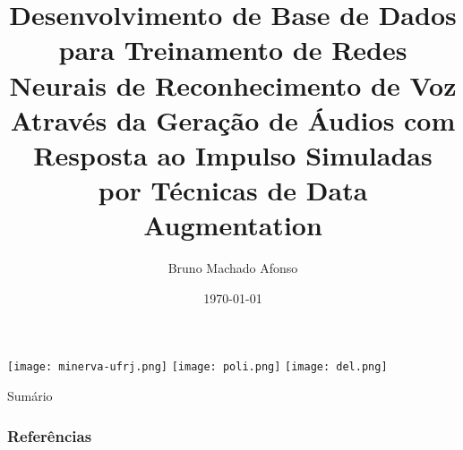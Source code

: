 \documentclass{libs/XJTLU_format}
\title[Defesa de Projeto de Graduação]{\normalsize\textbf{Desenvolvimento de Base de Dados para Treinamento de Redes Neurais de Reconhecimento de Voz
Através da Geração de Áudios com Resposta ao Impulso Simuladas por Técnicas de Data Augmentation}}
\author{Bruno Machado Afonso}
\institute[- Escola Politécnica]{
    \email{bruno.ma@poli.ufrj.br}
    \newline
    \department{\scriptsize Departamento de Engenharia Eletrônica e de Computação - Escola Politécnica}
    \newline
    \university{\scriptsize Universidade Federal do Rio de Janeiro}
}
\date{\today}
\begin{document}


\begin{frame}{}
    \texttt{[image: minerva-ufrj.png]} \hspace{3cm} \vspace{-0.2cm}
    \texttt{[image: poli.png]} \hspace{2cm} \vspace{-0.2cm}
    \texttt{[image: del.png]} \hspace{-0.1cm} \vspace{-0.1cm}
    \maketitle
\end{frame} 

\begin{frame}{Sumário}
        \tableofcontents
\end{frame}









\begin{frame}[allowframebreaks]
    \frametitle{Referências}
    \printbibliography
\end{frame}
\end{document}
